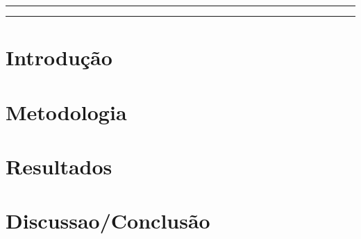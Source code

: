 \documentclass[12pt,a4paper,twoside]{article}
\author[1]{Bruno Martins Valério Bomfim}
\author[1]{Prof. Dra. Marília Miranda Forte Gomes}
\author[1]{Prof. Dr. Cristiano Jacques Miosso Rodrigues Mendes}
\affil[1]{Universidade de Brasília}
\begin{document}
\maketitle

\thispagestyle{capa}


\hrule

\begin{abstract}
\noindent
\vspace{2\baselineskip}
\end{abstract}
\vspace{5mm}

\hrule


\section{Introdução} %


\section{Metodologia} %


\section{Resultados} %

    

\section{Discussao/Conclusão} %



\end{document}
